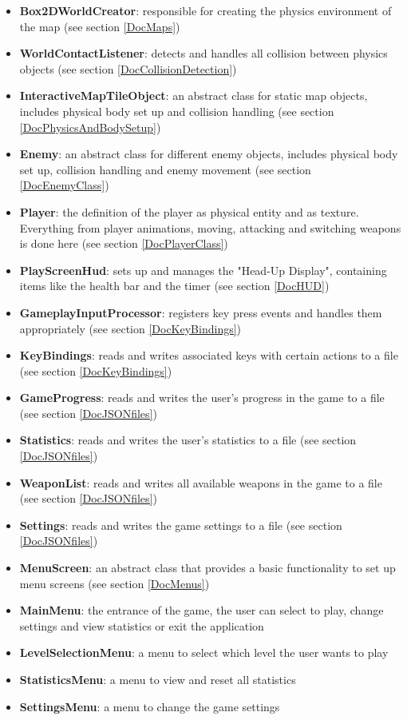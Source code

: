 \documentclass[12p]{article}
\begin{document}
\begin{itemize}
 \item \textbf{Box2DWorldCreator}: responsible for creating the physics environment of the map (see section \ref{DocMaps})
 \item \textbf{WorldContactListener}: detects and handles all collision between physics objects (see section \ref{DocCollisionDetection})
 \item \textbf{InteractiveMapTileObject}: an abstract class for static map objects, includes physical body set up and collision handling (see section \ref{DocPhysicsAndBodySetup})
 \item \textbf{Enemy}: an abstract class for different enemy objects, includes physical body set up, collision handling and enemy movement (see section \ref{DocEnemyClass})
 \item \textbf{Player}: the definition of the player as physical entity and as texture. Everything from player animations, moving, attacking and switching weapons is done here (see section \ref{DocPlayerClass})
 \item \textbf{PlayScreenHud}: sets up and manages the "Head-Up Display", containing items like the health bar and the timer (see section \ref{DocHUD})
 \item \textbf{GameplayInputProcessor}: registers key press events and handles them appropriately (see section \ref{DocKeyBindings})
 \item \textbf{KeyBindings}: reads and writes associated keys with certain actions to a file (see section \ref{DocKeyBindings})
 \item \textbf{GameProgress}: reads and writes the user's progress in the game to a file (see section \ref{DocJSONfiles})
 \item \textbf{Statistics}: reads and writes the user's statistics to a file (see section \ref{DocJSONfiles})
 \item \textbf{WeaponList}: reads and writes all available weapons in the game to a file (see section \ref{DocJSONfiles})
 \item \textbf{Settings}: reads and writes the game settings to a file (see section \ref{DocJSONfiles})
 \item \textbf{MenuScreen}: an abstract class that provides a basic functionality to set up menu screens (see section \ref{DocMenus})
 \item \textbf{MainMenu}: the entrance of the game, the user can select to play, change settings and view statistics or exit the application
 \item \textbf{LevelSelectionMenu}: a menu to select which level the user wants to play
 \item \textbf{StatisticsMenu}: a menu to view and reset all statistics
 \item \textbf{SettingsMenu}: a menu to change the game settings
\end{itemize}
\end{document}

